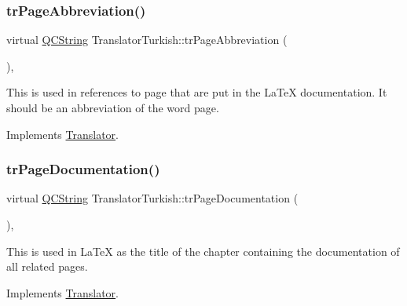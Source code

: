 \mbox{\label{class_translator_turkish_a01fb3f80faed2b664edb0664b04a0d72}} 
\subsubsection{\texorpdfstring{trPageAbbreviation()}{trPageAbbreviation()}}
{\footnotesize\ttfamily virtual \mbox{\hyperlink{class_q_c_string}{Q\+C\+String}} Translator\+Turkish\+::tr\+Page\+Abbreviation (\begin{DoxyParamCaption}{ }\end{DoxyParamCaption})\hspace{0.3cm}{\ttfamily [inline]}, {\ttfamily [virtual]}}

This is used in references to page that are put in the La\+TeX documentation. It should be an abbreviation of the word page. 

Implements \mbox{\hyperlink{class_translator}{Translator}}.

\mbox{\label{class_translator_turkish_aed1d9296eec42127dc4725ecff1923d8}} 
\subsubsection{\texorpdfstring{trPageDocumentation()}{trPageDocumentation()}}
{\footnotesize\ttfamily virtual \mbox{\hyperlink{class_q_c_string}{Q\+C\+String}} Translator\+Turkish\+::tr\+Page\+Documentation (\begin{DoxyParamCaption}{ }\end{DoxyParamCaption})\hspace{0.3cm}{\ttfamily [inline]}, {\ttfamily [virtual]}}

This is used in La\+TeX as the title of the chapter containing the documentation of all related pages. 

Implements \mbox{\hyperlink{class_translator}{Translator}}.

\mbox{\label{class_translator_turkish_a03169e3733d62b342589a08451b4b547}} 
